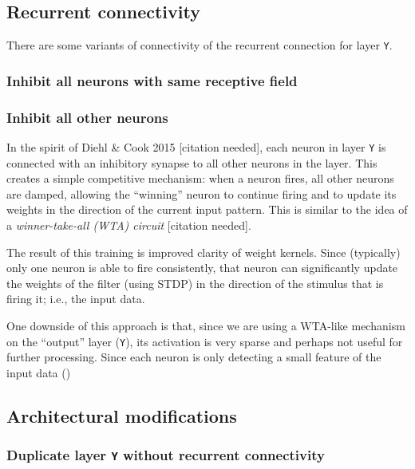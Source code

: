 \documentclass{article}
\begin{document}
\subsection{Recurrent connectivity}

There are some variants of connectivity of the recurrent connection for layer \texttt{Y}.

\subsubsection{Inhibit all neurons with same receptive field}

\subsubsection{Inhibit all other neurons}

In the spirit of Diehl \& Cook 2015 [citation needed], each neuron in layer \texttt{Y} is connected with an inhibitory synapse to all other neurons in the layer. This creates a simple competitive mechanism: when a neuron fires, all other neurons are damped, allowing the ``winning'' neuron to continue firing and to update its weights in the direction of the current input pattern. This is similar to the idea of a \textit{winner-take-all (WTA) circuit} [citation needed].

The result of this training is improved clarity of weight kernels. Since (typically) only one neuron is able to fire consistently, that neuron can significantly update the weights of the filter (using STDP) in the direction of the stimulus that is firing it; i.e., the input data.

One downside of this approach is that, since we are using a WTA-like mechanism on the ``output'' layer (\texttt{Y}), its activation is very sparse and perhaps not useful for further processing. Since each neuron is only detecting a small feature of the input data ()

\subsection{Architectural modifications}

\subsubsection{Duplicate layer \texttt{Y} without recurrent connectivity}
\end{document}
